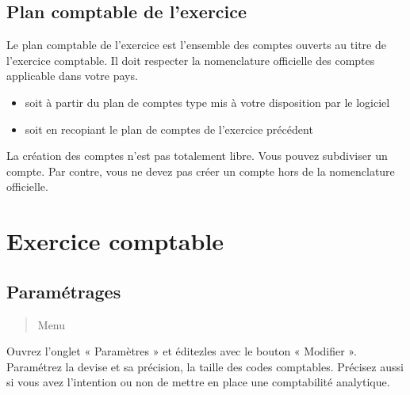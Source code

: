 \documentclass[a4paper,10pt,oneside,french]{sphinxmanual}
\begin{document}
\subsection{Plan comptable de l’exercice}
\label{\detokenize{accounting/definition:plan-comptable-de-l-exercice}}
\sphinxAtStartPar
Le plan comptable de l’exercice est l’ensemble des comptes ouverts au titre de l’exercice comptable. Il doit respecter  la nomenclature officielle des comptes applicable dans votre pays.
\begin{description}
\begin{itemize}
\item {} 
\sphinxAtStartPar
soit  à partir du plan de comptes type mis à votre disposition par le logiciel

\item {} 
\sphinxAtStartPar
soit en recopiant le plan de comptes de l’exercice précédent

\end{itemize}

\end{description}

\sphinxAtStartPar
La création des comptes n’est pas totalement libre. Vous pouvez subdiviser un compte. Par contre, vous ne devez pas créer un compte hors de la nomenclature officielle.

\sphinxstepscope


\section{Exercice comptable}
\label{\detokenize{accounting/fiscalyear:exercice-comptable}}\label{\detokenize{accounting/fiscalyear::doc}}

\subsection{Paramétrages}
\label{\detokenize{accounting/fiscalyear:parametrages}}\begin{quote}

\sphinxAtStartPar
Menu 
\end{quote}

\sphinxAtStartPar
Ouvrez l’onglet « Paramètres » et éditez\sphinxhyphen{}les avec le bouton « Modifier ». Paramétrez la devise et sa précision, la taille des codes comptables. Précisez aussi si vous avez l’intention ou non de mettre en place une comptabilité analytique.
\begin{quote}

\noindent{}
\end{quote}
\end{document}
